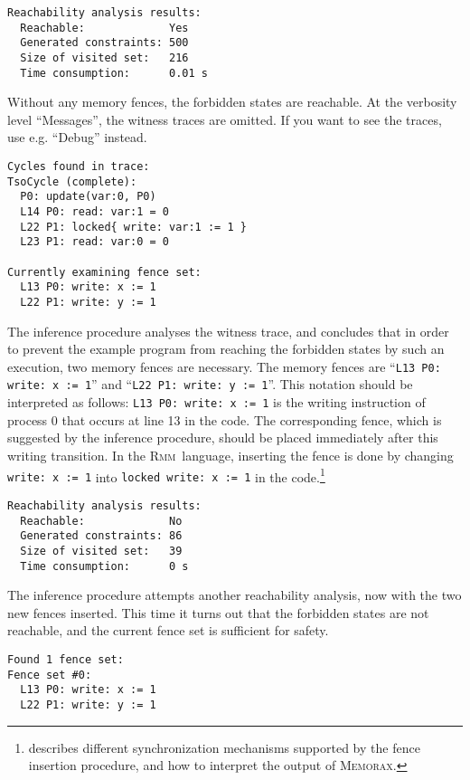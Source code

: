 \documentclass[a4paper]{article}
\newcommand{\memorax}{\textsc{Memorax}}
\newcommand{\rmm}{\textsc{Rmm}}
\begin{document}
\noindent
\begin{verbatim}
Reachability analysis results:
  Reachable:             Yes
  Generated constraints: 500
  Size of visited set:   216
  Time consumption:      0.01 s
\end{verbatim}

Without any memory fences, the forbidden states are reachable. At the
verbosity level ``Messages'', the witness traces are omitted. If you
want to see the traces, use e.g. ``Debug'' instead.

\noindent
\begin{verbatim}
Cycles found in trace:
TsoCycle (complete):
  P0: update(var:0, P0)
  L14 P0: read: var:1 = 0
  L22 P1: locked{ write: var:1 := 1 }
  L23 P1: read: var:0 = 0

Currently examining fence set:
  L13 P0: write: x := 1
  L22 P1: write: y := 1
\end{verbatim}

The inference procedure analyses the witness trace, and concludes that
in order to prevent the example program from reaching the forbidden
states by such an execution, two memory fences are necessary. The
memory fences are ``{\tt L13 P0: write: x := 1}'' and ``{\tt L22 P1:
  write: y := 1}''. This notation should be interpreted as follows:
{\tt L13 P0: write: x := 1} is the writing instruction of process 0
that occurs at line 13 in the code. The corresponding fence, which is
suggested by the inference procedure, should be placed immediately
after this writing transition. In the \rmm\ language, inserting the
fence is done by changing {\tt write: x := 1} into {\tt locked write:
  x := 1} in the code.\footnote{ describes
  different synchronization mechanisms supported by the fence
  insertion procedure, and how to interpret the output of \memorax.}

\noindent
\begin{verbatim}
Reachability analysis results:
  Reachable:             No
  Generated constraints: 86
  Size of visited set:   39
  Time consumption:      0 s
\end{verbatim}

The inference procedure attempts another reachability analysis, now
with the two new fences inserted. This time it turns out that the
forbidden states are not reachable, and the current fence set is
sufficient for safety.

\noindent
\begin{verbatim}
Found 1 fence set:
Fence set #0:
  L13 P0: write: x := 1
  L22 P1: write: y := 1
\end{verbatim}
\end{document}
